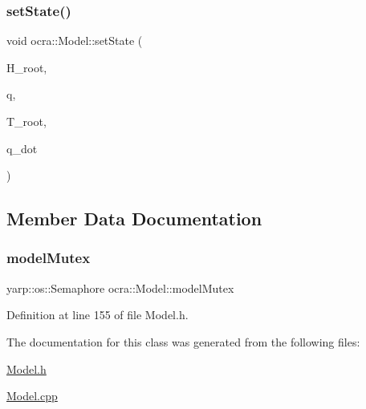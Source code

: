\hypertarget{classocra_1_1Model_a6c4feba35aac697c1f18537c8c7c9ce4}{}\label{classocra_1_1Model_a6c4feba35aac697c1f18537c8c7c9ce4} 
\subsubsection{\texorpdfstring{set\+State()}{setState()}\hspace{0.1cm}{\footnotesize\ttfamily [2/2]}}
{\footnotesize\ttfamily void ocra\+::\+Model\+::set\+State (\begin{DoxyParamCaption}\item[{const Eigen\+::\+Displacementd \&}]{H\+\_\+root,  }\item[{const Eigen\+::\+Vector\+Xd \&}]{q,  }\item[{const Eigen\+::\+Twistd \&}]{T\+\_\+root,  }\item[{const Eigen\+::\+Vector\+Xd \&}]{q\+\_\+dot }\end{DoxyParamCaption})}



\subsection{Member Data Documentation}
\hypertarget{classocra_1_1Model_a45b4c8b4b6480355f2abb06bb55f7146}{}\label{classocra_1_1Model_a45b4c8b4b6480355f2abb06bb55f7146} 
\subsubsection{\texorpdfstring{model\+Mutex}{modelMutex}}
{\footnotesize\ttfamily yarp\+::os\+::\+Semaphore ocra\+::\+Model\+::model\+Mutex}



Definition at line 155 of file Model.\+h.



The documentation for this class was generated from the following files\+:\begin{DoxyCompactItemize}
\item 
\hyperlink{Model_8h}{Model.\+h}\item 
\hyperlink{Model_8cpp}{Model.\+cpp}\end{DoxyCompactItemize}
